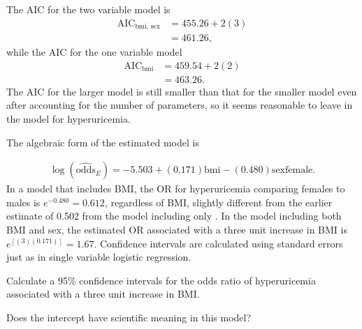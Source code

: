 The AIC for the two variable model is 
\begin{align*}
\text{AIC}_{\text{bmi, sex}} &= 455.26 + 2(3) \\
             &= 461.26,
\end{align*}
while the AIC for the one variable model
\begin{align*}
\text{AIC}_{\text{bmi}} &= 459.54 + 2(2)  \\
             &= 463.26.
\end{align*}
The AIC for the larger model is still smaller than that for the smaller model even after accounting for  the number of parameters, so it seems reasonable to leave  in the model for hyperuricemia.

The algebraic form of the estimated model is

\begin{align}
  \log(\widehat{\text{odds}}_E) = -5.503 + (0.171)\text{bmi}
      -(0.480)\text{sexfemale}.
      \label{eqn:huBmiSexLogReg}
\end{align}
In a model that includes BMI, the OR for hyperuricemia comparing females to males is $e^{-0.480} = 0.612$, regardless of BMI, slightly different from the earlier estimate of 0.502 from the model including only .  In the model including both BMI and sex, the estimated OR associated with a three unit increase in BMI is $e^{[(3)(0.171)]} = 1.67$. Confidence intervals are calculated using standard errors just as in single variable logistic regression.


\begin{exercisewrap}
  \begin{nexercise}
    Calculate a 95\% confidence intervals for the odds ratio of hyperuricemia associated with a three unit increase in BMI.     \footnotemark{}
  \end{nexercise}
\end{exercisewrap}

\begin{exercisewrap}
\begin{nexercise}
Does the intercept have scientific meaning in this model? \footnotemark{}
\end{nexercise}
\end{exercisewrap}

